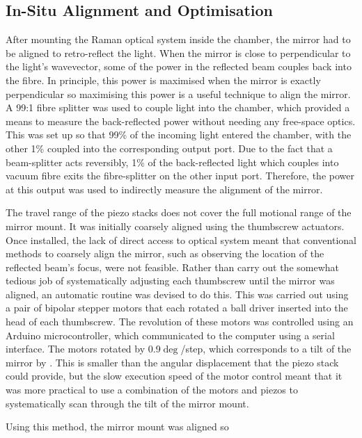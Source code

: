 \subsection{In-Situ Alignment and Optimisation} 
After mounting the Raman optical system inside the chamber, the
mirror had to be aligned to retro-reflect the light. When the mirror is close to
perpendicular to the light's wavevector, some of the power in the reflected beam
couples back into the fibre. In principle, this power is maximised when the
mirror is exactly perpendicular so maximising this power is a useful technique
to align the mirror. A 99:1 fibre splitter was used to couple light into the
chamber, which provided a means to measure the back-reflected power without
needing any free-space optics. This was set up so that 99\% of the incoming
light entered the chamber, with the other 1\% coupled into the corresponding
output port. Due to the fact that a beam-splitter acts reversibly, 1\% of the
back-reflected light which couples into vacuum fibre exits the fibre-splitter on
the other input port. Therefore, the power at this output was used to indirectly
measure the alignment of the mirror.  
\par\noindent 
The travel range of the piezo stacks does not cover the full motional
range of the mirror mount. It was initially coarsely aligned using the
thumbscrew actuators.
Once
installed, the lack of direct access to optical system meant that conventional
methods to coarsely align the mirror, such as observing the location of the
reflected beam's focus, were not feasible. Rather than carry out the somewhat
tedious job of systematically adjusting each thumbscrew until the mirror was
aligned, an automatic routine was devised to do this. This was carried out using
a pair of bipolar stepper motors that each rotated a ball driver inserted into
the head of each thumbscrew. The revolution of these motors was controlled using
an Arduino microcontroller, which communicated to the computer using a serial
interface.  The motors rotated by 0.9\(\deg\)/step, which corresponds to a tilt
of the mirror by . This is smaller than the
 angular displacement that the piezo stack could
provide, but the slow execution speed of the motor control meant that it was
more practical to use a combination of the motors and piezos to systematically
scan through the tilt of the mirror mount.  %
\par\noindent 
Using this method, the mirror mount was aligned so
